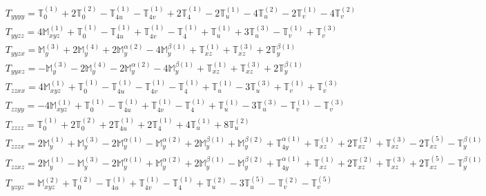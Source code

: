 \documentclass[fleqn,8pt,landscape]{jsarticle}
\begin{document}
\begin{align*}
& T_{yyyy} = \mathbb{T}_{0}^{(1)} + 2 \mathbb{T}_{0}^{(2)} - \mathbb{T}_{4u}^{(1)} - \mathbb{T}_{4v}^{(1)} + 2 \mathbb{T}_{4}^{(1)} - 2 \mathbb{T}_{u}^{(1)} - 4 \mathbb{T}_{u}^{(2)} - 2 \mathbb{T}_{v}^{(1)} - 4 \mathbb{T}_{v}^{(2)} \\
& T_{yyzz} = 4 \mathbb{M}_{xyz}^{(1)} + \mathbb{T}_{0}^{(1)} - \mathbb{T}_{4u}^{(1)} + \mathbb{T}_{4v}^{(1)} - \mathbb{T}_{4}^{(1)} + \mathbb{T}_{u}^{(1)} + 3 \mathbb{T}_{u}^{(3)} - \mathbb{T}_{v}^{(1)} + \mathbb{T}_{v}^{(3)} \\
& T_{yyzx} = \mathbb{M}_{y}^{(3)} + 2 \mathbb{M}_{y}^{(4)} + 2 \mathbb{M}_{y}^{\alpha(2)} - 4 \mathbb{M}_{y}^{\beta(1)} + \mathbb{T}_{xz}^{(1)} + \mathbb{T}_{xz}^{(3)} + 2 \mathbb{T}_{y}^{\beta(1)} \\
& T_{yyxz} = - \mathbb{M}_{y}^{(3)} - 2 \mathbb{M}_{y}^{(4)} - 2 \mathbb{M}_{y}^{\alpha(2)} - 4 \mathbb{M}_{y}^{\beta(1)} + \mathbb{T}_{xz}^{(1)} + \mathbb{T}_{xz}^{(3)} + 2 \mathbb{T}_{y}^{\beta(1)} \\
& T_{zzxx} = 4 \mathbb{M}_{xyz}^{(1)} + \mathbb{T}_{0}^{(1)} - \mathbb{T}_{4u}^{(1)} - \mathbb{T}_{4v}^{(1)} - \mathbb{T}_{4}^{(1)} + \mathbb{T}_{u}^{(1)} - 3 \mathbb{T}_{u}^{(3)} + \mathbb{T}_{v}^{(1)} + \mathbb{T}_{v}^{(3)} \\
& T_{zzyy} = - 4 \mathbb{M}_{xyz}^{(1)} + \mathbb{T}_{0}^{(1)} - \mathbb{T}_{4u}^{(1)} + \mathbb{T}_{4v}^{(1)} - \mathbb{T}_{4}^{(1)} + \mathbb{T}_{u}^{(1)} - 3 \mathbb{T}_{u}^{(3)} - \mathbb{T}_{v}^{(1)} - \mathbb{T}_{v}^{(3)} \\
& T_{zzzz} = \mathbb{T}_{0}^{(1)} + 2 \mathbb{T}_{0}^{(2)} + 2 \mathbb{T}_{4u}^{(1)} + 2 \mathbb{T}_{4}^{(1)} + 4 \mathbb{T}_{u}^{(1)} + 8 \mathbb{T}_{u}^{(2)} \\
& T_{zzzx} = 2 \mathbb{M}_{y}^{(1)} + \mathbb{M}_{y}^{(3)} - 2 \mathbb{M}_{y}^{\alpha(1)} - \mathbb{M}_{y}^{\alpha(2)} + 2 \mathbb{M}_{y}^{\beta(1)} + \mathbb{M}_{y}^{\beta(2)} + \mathbb{T}_{4y}^{\alpha(1)} + \mathbb{T}_{xz}^{(1)} + 2 \mathbb{T}_{xz}^{(2)} + \mathbb{T}_{xz}^{(3)} - 2 \mathbb{T}_{xz}^{(5)} - \mathbb{T}_{y}^{\beta(1)} \\
& T_{zzxz} = 2 \mathbb{M}_{y}^{(1)} - \mathbb{M}_{y}^{(3)} - 2 \mathbb{M}_{y}^{\alpha(1)} + \mathbb{M}_{y}^{\alpha(2)} + 2 \mathbb{M}_{y}^{\beta(1)} - \mathbb{M}_{y}^{\beta(2)} + \mathbb{T}_{4y}^{\alpha(1)} + \mathbb{T}_{xz}^{(1)} + 2 \mathbb{T}_{xz}^{(2)} + \mathbb{T}_{xz}^{(3)} + 2 \mathbb{T}_{xz}^{(5)} - \mathbb{T}_{y}^{\beta(1)} \\
& T_{yzyz} = \mathbb{M}_{xyz}^{(2)} + \mathbb{T}_{0}^{(2)} - \mathbb{T}_{4u}^{(1)} + \mathbb{T}_{4v}^{(1)} - \mathbb{T}_{4}^{(1)} + \mathbb{T}_{u}^{(2)} - 3 \mathbb{T}_{u}^{(5)} - \mathbb{T}_{v}^{(2)} - \mathbb{T}_{v}^{(5)} \\

\end{align*}
\end{document}
